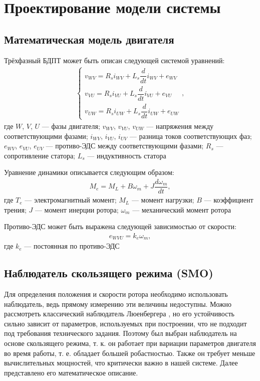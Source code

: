 \chapter{Проектирование модели системы}
\label{cha:chap4}

\section{Математическая модель двигателя}

Трёхфазный БДПТ может быть описан следующей системой уравнений\cite{art:dtc_smo}: 
\begin{align}
\label{sys:abc}
\left\{ \begin{aligned} 
  v_{WV}=R_si_{WV}+L_s\dfrac{d}{dt}i_{WV}+e_{WV}\\
  v_{VU}=R_si_{VU}+L_s\dfrac{d}{dt}i_{VU}+e_{VU}\\
  v_{UW}=R_si_{UW}+L_s\dfrac{d}{dt}i_{UW}+e_{UW}
\end{aligned} \right.,
\end{align}где $W$, $V$, $U$ --- фазы двигателя; $v_{WV}$, $v_{VU}$, $v_{UW}$ --- напряжения между соответствующими фазами; $i_{WV}$, $i_{VU}$, $i_{UV}$ --- разница токов соответствующих фаз; $e_{WV}$, $e_{VU}$, $e_{UV}$ --- противо-ЭДС между соответствующими фазами; $R_s$ --- сопротивление статора; $L_s$ --- индуктивность статора

Уравнение динамики описывается следующим образом:
\begin{align*}
	M_e = M_L+B\omega_m+J\dfrac{d\omega_m}{dt},
\end{align*}где $T_e$ --- электромагнитный момент; $M_L$ --- момент нагрузки; $B$ --- коэффициент трения; $J$ --- момент инерции ротора; $\omega_m$ --- механический момент ротора

Противо-ЭДС может быть выражена следующей зависимостью от скорости:
\begin{align*}
	e_{WVU}=k_e\omega_m,
\end{align*}где $k_e$ --- постоянная по противо-ЭДС

\section{Наблюдатель скользящего режима (SMO)}
\label{sec:smo}

Для определения положения и скорости ротора необходимо использовать наблюдатель, ведь прямому измерению эти величины недоступны. Можно рассмотреть классический наблюдатель Люенбергера \cite{art:obs_luen_bldc}, но его устойчивость сильно зависит от параметров, используемых при построении, что не подходит под требования технического задания. Поэтому был выбран наблюдатель на основе скользящего режима, т. к. он работает при вариации параметров двигателя во время работы, т. е. обладает большей робастностью. Также он требует меньше вычислительных мощностей, что критически важно в нашей системе. Далее представлено его математическое описание. 

